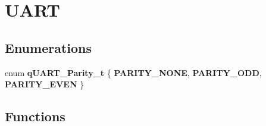 \hypertarget{group___u_a_r_t}{\section{\-U\-A\-R\-T}
\label{group___u_a_r_t}
}
\subsection*{\-Enumerations}
\begin{DoxyCompactItemize}
\item 
enum {\bfseries q\-U\-A\-R\-T\-\_\-\-Parity\-\_\-t} \{ {\bfseries \-P\-A\-R\-I\-T\-Y\-\_\-\-N\-O\-N\-E}, 
{\bfseries \-P\-A\-R\-I\-T\-Y\-\_\-\-O\-D\-D}, 
{\bfseries \-P\-A\-R\-I\-T\-Y\-\_\-\-E\-V\-E\-N}
 \}
\end{DoxyCompactItemize}
\subsection*{\-Functions}
